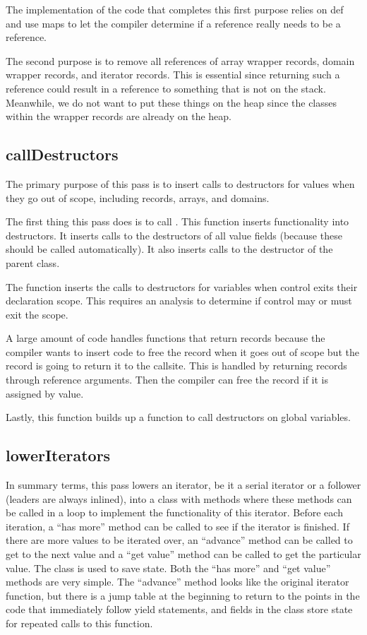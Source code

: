 \documentclass[10pt]{article}
\begin{document}
The implementation of the code that completes this first purpose
relies on def and use maps to let the compiler determine if a
reference really needs to be a reference.

The second purpose is to remove all references of array wrapper
records, domain wrapper records, and iterator records.  This is
essential since returning such a reference could result in a reference
to something that is not on the stack.  Meanwhile, we do not want to
put these things on the heap since the classes within the wrapper
records are already on the heap.

\subsection{callDestructors}

The primary purpose of this pass is to insert calls to destructors for
values when they go out of scope, including records, arrays, and
domains.

The first thing this pass does is to call .  This
function inserts functionality into destructors.  It inserts calls to
the destructors of all value fields (because these should be called
automatically).  It also inserts calls to the destructor of the parent
class.

The function  inserts the calls to
destructors for variables when control exits their declaration scope.
This requires an analysis to determine if control may or must exit the
scope.

A large amount of code handles functions that return records because
the compiler wants to insert code to free the record when it goes out
of scope but the record is going to return it to the callsite.  This
is handled by returning records through reference arguments.  Then the
compiler can free the record if it is assigned by value.

Lastly, this function builds up a function to call destructors on
global variables.

\subsection{lowerIterators}
\label{sec:lowerIterators}

In summary terms, this pass lowers an iterator, be it a serial
iterator or a follower (leaders are always inlined), into a class with
methods where these methods can be called in a loop to implement the
functionality of this iterator.  Before each iteration, a ``has more''
method can be called to see if the iterator is finished.  If there are
more values to be iterated over, an ``advance'' method can be called
to get to the next value and a ``get value'' method can be called to
get the particular value.  The class is used to save state.  Both the
``has more'' and ``get value'' methods are very simple.  The
``advance'' method looks like the original iterator function, but
there is a jump table at the beginning to return to the points in the
code that immediately follow yield statements, and fields in the class
store state for repeated calls to this function.
\end{document}
